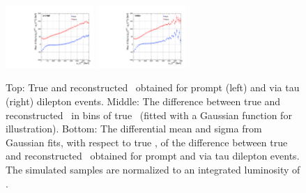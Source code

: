 \begin{figure}
\begin{center}
    \includegraphics[width=0.30\textwidth]{fig_fullRun2UL/KinRecoResolutions/top_pT_multiresidual_prompt.pdf}
    \includegraphics[width=0.30\textwidth]{fig_fullRun2UL/KinRecoResolutions/top_pT_multiresidual_viatau.pdf}\\
    \caption{\small Top: True and reconstructed \ptt\ obtained for prompt (left) and via tau (right) \ttbar dilepton events.
    Middle: The difference between true and reconstructed \ptt\ in bins of true \ptt\ (fitted with a Gaussian function for illustration).
    Bottom: The differential mean and sigma from Gaussian fits, with respect to true \ptt, of the difference between true and reconstructed \ptt\ obtained for prompt and via tau \ttbar dilepton events.
    The simulated samples are normalized to an integrated luminosity of \lumivalueRuniiUL.}
    \label{fig:kinrec:resolution-ptt}
 \end{center}
\end{figure}

